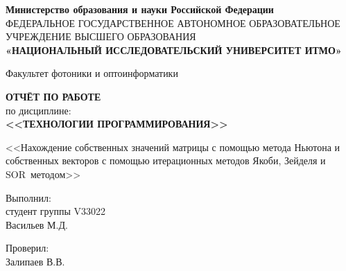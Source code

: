 \thispagestyle{empty}

\begin{center}
    \textbf{Министерство образования и науки Российской Федерации} \\
    ФЕДЕРАЛЬНОЕ ГОСУДАРСТВЕННОЕ АВТОНОМНОЕ ОБРАЗОВАТЕЛЬНОЕ УЧРЕЖДЕНИЕ ВЫСШЕГО ОБРАЗОВАНИЯ \\
    \textbf{\small{«НАЦИОНАЛЬНЫЙ ИССЛЕДОВАТЕЛЬСКИЙ УНИВЕРСИТЕТ ИТМО»}}
    \end{center}
    
\begin{center}
    Факультет фотоники и оптоинформатики
\end{center}

\vspace{0.1\paperheight}

\begin{center}
    \textbf{ОТЧЁТ ПО РАБОТЕ} \\
    по дисциплине: \\
    \textbf{<<ТЕХНОЛОГИИ ПРОГРАММИРОВАНИЯ>>}
\end{center}

\begin{center}
    <<Нахождение собственных значений матрицы с помощью метода Ньютона и собственных векторов с помощью итерационных методов Якоби, Зейделя и SOR~методом>>
\end{center}

\vspace{0.1\paperheight}

\begin{flushright}
    Выполнил: \\
    студент группы V33022 \\
    Васильев М.Д.
\end{flushright}

\begin{flushright}
    Проверил: \\
    Залипаев В.В.
\end{flushright}

\vspace{0pt plus4fill}

\newpage